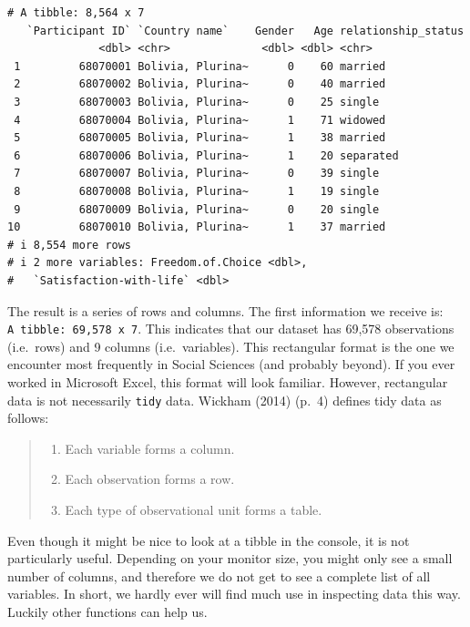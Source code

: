 \documentclass[
  letterpaper,
  DIV=11,
  numbers=noendperiod]{scrreprt}
\providecommand{\tightlist}{%
  \setlength{\itemsep}{0pt}\setlength{\parskip}{0pt}}\usepackage{longtable,booktabs,array}
\begin{document}
\begin{verbatim}
# A tibble: 8,564 x 7
   `Participant ID` `Country name`    Gender   Age relationship_status
              <dbl> <chr>              <dbl> <dbl> <chr>              
 1         68070001 Bolivia, Plurina~      0    60 married            
 2         68070002 Bolivia, Plurina~      0    40 married            
 3         68070003 Bolivia, Plurina~      0    25 single             
 4         68070004 Bolivia, Plurina~      1    71 widowed            
 5         68070005 Bolivia, Plurina~      1    38 married            
 6         68070006 Bolivia, Plurina~      1    20 separated          
 7         68070007 Bolivia, Plurina~      0    39 single             
 8         68070008 Bolivia, Plurina~      1    19 single             
 9         68070009 Bolivia, Plurina~      0    20 single             
10         68070010 Bolivia, Plurina~      1    37 married            
# i 8,554 more rows
# i 2 more variables: Freedom.of.Choice <dbl>,
#   `Satisfaction-with-life` <dbl>
\end{verbatim}

The result is a series of rows and columns. The first information we
receive is: \texttt{A\ tibble:\ 69,578\ x\ 7}. This indicates that our
dataset has 69,578 observations (i.e.~rows) and 9 columns
(i.e.~variables). This rectangular format is the one we encounter most
frequently in Social Sciences (and probably beyond). If you ever worked
in Microsoft Excel, this format will look familiar. However, rectangular
data is not necessarily \texttt{tidy} data. Wickham (2014) (p.~4)
defines tidy data as follows:

\begin{quote}
\begin{enumerate}
\def\labelenumi{\arabic{enumi}.}
\tightlist
\item
  Each variable forms a column.
\item
  Each observation forms a row.
\item
  Each type of observational unit forms a table.
\end{enumerate}
\end{quote}

Even though it might be nice to look at a tibble in the console, it is
not particularly useful. Depending on your monitor size, you might only
see a small number of columns, and therefore we do not get to see a
complete list of all variables. In short, we hardly ever will find much
use in inspecting data this way. Luckily other functions can help us.
\end{document}
